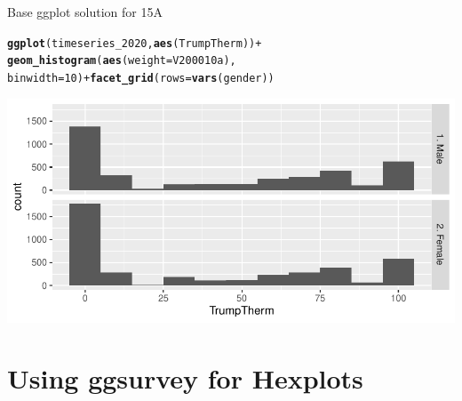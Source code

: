 \documentclass{beamer}\usepackage[]{graphicx}\usepackage[]{color}
\makeatletter
\newcommand{\hlnum}[1]{\textcolor[rgb]{0.686,0.059,0.569}{#1}}%
\newcommand{\hlopt}[1]{\textcolor[rgb]{0,0,0}{#1}}%
\newcommand{\hlstd}[1]{\textcolor[rgb]{0.345,0.345,0.345}{#1}}%
\newcommand{\hlkwc}[1]{\textcolor[rgb]{0.333,0.667,0.333}{#1}}%
\newcommand{\hlkwd}[1]{\textcolor[rgb]{0.737,0.353,0.396}{\textbf{#1}}}%
\newenvironment{kframe}{%
 \def\at@end@of@kframe{}%
 \ifinner\ifhmode%
  \def\at@end@of@kframe{\end{minipage}}%
  \begin{minipage}{\columnwidth}%
 \fi\fi%
 \def\FrameCommand##1{\hskip\@totalleftmargin \hskip-\fboxsep
 \colorbox{shadecolor}{##1}\hskip-\fboxsep
     \hskip-\linewidth \hskip-\@totalleftmargin \hskip\columnwidth}%
 \MakeFramed {\advance\hsize-\width
   \@totalleftmargin\z@ \linewidth\hsize
   \@setminipage}}%
 {\par\unskip\endMakeFramed%
 \at@end@of@kframe}
\newenvironment{knitrout}{}{} %
\makeatother
\begin{document}
\begin{frame}[fragile]{Base ggplot solution for 15A}
\begin{knitrout}
\color{fgcolor}\begin{kframe}
\begin{alltt}
\hlkwd{ggplot}\hlstd{(timeseries_2020,} \hlkwd{aes}\hlstd{(TrumpTherm))} \hlopt{+}
    \hlkwd{geom_histogram}\hlstd{(}\hlkwd{aes}\hlstd{(}\hlkwc{weight} \hlstd{= V200010a),}
        \hlkwc{binwidth} \hlstd{=} \hlnum{10}\hlstd{)} \hlopt{+} \hlkwd{facet_grid}\hlstd{(}\hlkwc{rows} \hlstd{=} \hlkwd{vars}\hlstd{(gender))}
\end{alltt}
\end{kframe}
\includegraphics[width=0.95\linewidth]{figure/unnamed-chunk-60-1} 
\end{knitrout}

\end{frame}


\section{Using ggsurvey for Hexplots}
\end{document}
